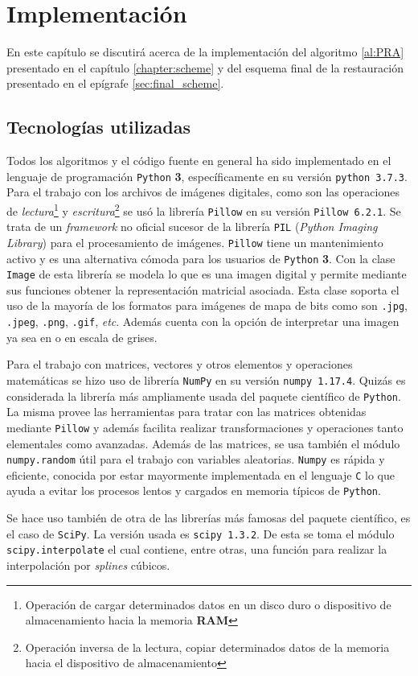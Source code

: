 \chapter{Implementaci\'on}\label{chapter:code}

En este capítulo se discutirá acerca de la implementación del algoritmo \ref{al:PRA} presentado en el capítulo \ref{chapter:scheme} y del esquema final de la restauraci\'on presentado en el epígrafe \ref{sec:final_scheme}.

\section{Tecnolog\'ias utilizadas}
Todos los algoritmos y el c\'odigo fuente en general ha sido implementado en el lenguaje de programaci\'on \texttt{Python} \textbf{3}, específicamente en su versi\'on \texttt{python 3.7.3}. Para el trabajo con los archivos de im\'agenes digitales, como son las operaciones de \textit{lectura}\footnote{Operaci\'on de cargar determinados datos en un disco duro o dispositivo de almacenamiento hacia la memoria \textbf{RAM}} y \textit{escritura}\footnote{Operaci\'on inversa de la lectura, copiar determinados datos de la memoria hacia el dispositivo de almacenamiento} se us\'o la librer\'ia \texttt{Pillow} en su versi\'on \texttt{Pillow 6.2.1}. Se trata de un \textit{framework} no oficial sucesor de la librería \texttt{PIL} (\textit{Python Imaging Library}) para el procesamiento de im\'agenes. \texttt{Pillow} tiene un mantenimiento activo y es una alternativa c\'omoda para los usuarios de \texttt{Python} \textbf{3}. Con la clase \texttt{Image} de esta librer\'ia se modela lo que es una imagen digital y permite mediante sus funciones obtener la representaci\'on matricial asociada. Esta clase soporta el uso de la mayor\'ia de los formatos para imágenes de mapa de bits como son \texttt{.jpg}, \texttt{.jpeg}, \texttt{.png}, \texttt{.gif}, \textit{etc}. Adem\'as cuenta con la opción de interpretar una imagen ya sea en \RGB o en escala de grises.

Para el trabajo con matrices, vectores y otros elementos y operaciones matem\'aticas se hizo uso de librer\'ia \texttt{NumPy} en su versi\'on \texttt{numpy 1.17.4}. Quizás es considerada la librer\'ia m\'as ampliamente usada del paquete científico de \texttt{Python}. La misma provee las herramientas para tratar con las matrices obtenidas mediante \texttt{Pillow} y adem\'as facilita realizar transformaciones y operaciones tanto elementales como avanzadas. Adem\'as de las matrices, se usa tambi\'en el m\'odulo \texttt{numpy.random} \'util para el trabajo con variables aleatorias. \texttt{Numpy} es r\'apida y eficiente, conocida por estar mayormente implementada en el lenguaje \texttt{C} lo que ayuda a evitar los procesos lentos y cargados en memoria t\'ipicos de \texttt{Python}.

Se hace uso tambi\'en de otra de las librer\'ias m\'as famosas del paquete científico, es el caso de \texttt{SciPy}. La versión usada es \texttt{scipy 1.3.2}. De esta se toma el m\'odulo \texttt{scipy.interpolate} el cual contiene, entre otras, una funci\'on para realizar la interpolaci\'on por \textit{splines} c\'ubicos.